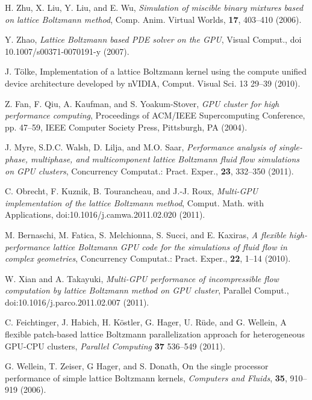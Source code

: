 \begin{thebibliography}{1}
H. Zhu, X. Liu, Y. Liu, and E. Wu,
\textit{Simulation of miscible binary mixtures based on lattice Boltzmann method},
Comp. Anim. Virtual Worlds, \textbf{17}, 403--410 (2006).

Y. Zhao,
\textit{Lattice Boltzmann based PDE solver on the GPU},
Visual Comput., doi 10.1007/s00371-0070191-y (2007).

J. T\"olke,
Implementation of a lattice Boltzmann kernel using the compute unified
device architecture developed by nVIDIA,
Comput. Visual Sci. 13 29--39 (2010).

Z. Fan, F. Qiu, A. Kaufman, and S. Yoakum-Stover,
\textit{GPU cluster for high performance computing},
Proceedings of ACM/IEEE Supercomputing Conference, pp. 47--59,
IEEE Computer Society Press, Pittsburgh, PA (2004).

J. Myre, S.D.C. Walsh, D. Lilja, and M.O. Saar,
\textit{Performance analysis of single-phase, multiphase, and multicomponent
lattice Boltzmann fluid flow simulations on GPU clusters},
Concurrency Computat.: Pract. Exper., \textbf{23}, 332--350 (2011).

C. Obrecht, F. Kuznik, B. Tourancheau, and J.-J. Roux,
\textit{Multi-GPU implementation of the lattice Boltzmann method},
Comput. Math. with Applications,
doi:10.1016/j.camwa.2011.02.020 (2011).

M. Bernaschi, M. Fatica, S. Melchionna, S. Succi, and E. Kaxiras,
\textit{A flexible high-performance lattice Boltzmann GPU code for the
simulations of fluid flow in complex geometries},
Concurrency Computat.: Pract. Exper., \textbf{22}, 1--14 (2010).

W. Xian and A. Takayuki,
\textit{Multi-GPU performance of incompressible flow computation by
lattice Boltzmann method on GPU cluster},
Parallel Comput., doi:10.1016/j.parco.2011.02.007 (2011). 

C. Feichtinger, J. Habich, H. K\"ostler, G. Hager, U. R\"ude, and
G. Wellein,
A flexible patch-based lattice Boltzmann parallelization approach
for heterogeneous GPU-CPU clusters,
\textit{Parallel Computing} \textbf{37} 536--549 (2011).

G. Wellein, T. Zeiser, G Hager, and S. Donath,
On the single processor performance of simple lattice Boltzmann kernels,
\textit{Computers and Fluids}, \textbf{35}, 910--919 (2006).


\end{thebibliography}
